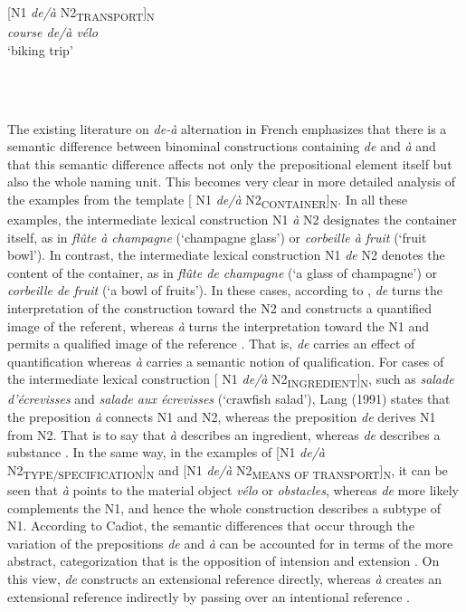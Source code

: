 \documentclass[output=paper]{langsci/langscibook}
\begin{document}
\begin{minipage}{0.4\textwidth}
[N1 \textit{de/à} N2\textsubscript{TRANSPORT}]\textsubscript{N}\\
\textit{course de/à vélo}\\
`biking trip'\\
\end{minipage}\\
\hfill \\
\begin{minipage}{0.4\textwidth}
\end{minipage}

The existing literature on \textit{de-à} alternation in French emphasizes that there is a semantic difference between binominal constructions containing \textit{de} and \textit{à} and that this semantic difference affects not only the prepositional element itself but also the whole naming unit. This becomes very clear in more detailed analysis of the examples from the template [ N1 \textit{de/à} N2\textsubscript{CONTAINER}]\textsubscript{N}. In all these examples, the intermediate lexical construction N1 \textit{à} N2 designates the container itself, as in \textit{flûte à champagne} (`champagne glass') or \textit{corbeille à fruit} (`fruit bowl'). In contrast, the intermediate lexical construction N1 \textit{de} N2 denotes the content of the container, as in \textit{flûte de champagne} (`a glass of champagne') or \textit{corbeille de fruit} (`a bowl of fruits'). In these cases, according to \citet{Cadiot:1997}, \textit{de} turns the interpretation of the construction toward the N2 and constructs a quantified image of the referent, whereas \textit{à} turns the interpretation toward the N1 and permits a qualified image of the reference \citep[44]{Cadiot:1997}. That is, \textit{de} carries an effect of quantification whereas \textit{à} carries a semantic notion of qualification. For cases of the intermediate lexical construction [ N1 \textit{de/à} N2\textsubscript{INGREDIENT}]\textsubscript{N}, such as \textit{salade d’écrevisses} and \textit{salade aux écrevisses} (`crawfish salad'), Lang (1991) states that the preposition \textit{à} connects N1 and N2, whereas the preposition \textit{de} derives N1 from N2. That is to say that \textit{à} describes an ingredient, whereas \textit{de} describes a substance \citep[283]{Lang:1991}. In the same way, in the examples of [N1 \textit{de/à} N2\textsubscript{TYPE/SPECIFICATION}]\textsubscript{N} and [N1 \textit{de/à} N2\textsubscript{MEANS OF TRANSPORT}]\textsubscript{N}, it can be seen that \textit{à} points to the material object \textit{vélo} or \textit{obstacles}, whereas  \textit{de} more likely complements the N1, and hence the whole construction describes a subtype of N1. According to Cadiot, the semantic differences that occur through the variation of the prepositions \textit{de} and \textit{à} can be accounted for in terms of the more abstract, categorization that is the opposition of intension and extension \citep[43]{Cadiot:1997}. On this view, \textit{de} constructs an extensional reference  directly, whereas \textit{à} creates an extensional reference  indirectly by passing over an intentional reference \citep[62]{Cadiot:1997}. 
\end{document}
